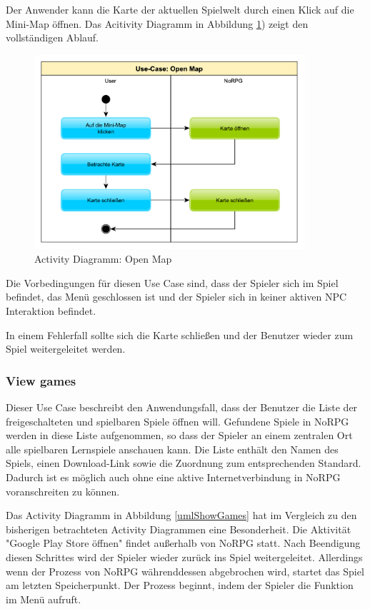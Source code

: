 			Der Anwender kann die Karte der aktuellen Spielwelt durch einen Klick auf die Mini-Map öffnen. Das Acitivity Diagramm in Abbildung \ref{umlOpenMap}) zeigt den vollständigen Ablauf.
			
			\begin{figure}[htbp]
				\centering 
				\label{umlOpenMap}
				\includegraphics[width=10cm]{pics/OpenMap.pdf}
				\caption{Activity Diagramm: Open Map}
			\end{figure}
			
			Die Vorbedingungen für diesen Use Case sind, dass der Spieler sich im Spiel befindet, das Menü geschlossen ist und der Spieler sich in keiner aktiven \ac{NPC} Interaktion befindet.
			
			In einem Fehlerfall sollte sich die Karte schließen und der Benutzer wieder zum Spiel weitergeleitet werden.
	
		\subsubsection{View games}
			Dieser Use Case beschreibt den Anwendungsfall, dass der Benutzer die Liste der freigeschalteten und spielbaren Spiele öffnen will. Gefundene Spiele in NoRPG werden in diese Liste aufgenommen, so dass der Spieler an einem zentralen Ort alle spielbaren Lernspiele anschauen kann. Die Liste enthält den Namen des Spiels, einen Download-Link sowie die Zuordnung zum entsprechenden Standard. Dadurch ist es möglich auch ohne eine aktive Internetverbindung in NoRPG voranschreiten zu können.
			
			Das Activity Diagramm in Abbildung \ref{umlShowGames} hat im Vergleich zu den bisherigen betrachteten Activity Diagrammen eine Besonderheit. Die Aktivität "Google Play Store öffnen" findet außerhalb von NoRPG statt. Nach Beendigung diesen Schrittes wird der Spieler wieder zurück ins Spiel weitergeleitet. Allerdings wenn der Prozess von NoRPG währenddessen abgebrochen wird, startet das Spiel am letzten Speicherpunkt. Der Prozess beginnt, indem der Spieler die Funktion im Menü aufruft.
			
